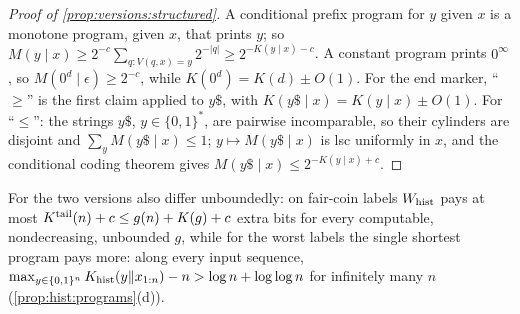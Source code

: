 \begin{proof}[Proof of \cref{prop:versions:structured}]
A conditional prefix program for $y$ given $x$ is a monotone program, given $x$, that prints $y$; so $M(y\mid x)\ge2^{-c}\sum_{q:V(q,x)=y}2^{-|q|}\ge2^{-K(y\mid x)-c}$. A constant program prints $0^\infty$, so $M(0^d\mid\epsilon)\ge2^{-c}$, while $K(0^d)=K(d)\pm O(1)$. For the end marker, ``$\ge$'' is the first claim applied to $y\$$, with $K(y\$\mid x)=K(y\mid x)\pm O(1)$. For ``$\le$'': the strings $y\$$, $y\in\{0,1\}^*$, are pairwise incomparable, so their cylinders are disjoint and $\sum_yM(y\$\mid x)\le1$; $y\mapsto M(y\$\mid x)$ is lsc uniformly in $x$, and the conditional coding theorem gives $M(y\$\mid x)\le2^{-K(y\mid x)+c}$.
\end{proof}

\begin{remark}\label{rem:versions:hist}
For \SFIhist{} the two versions also differ unboundedly: on fair-coin labels $W_{\mathrm{hist}}$ pays at most $K^{\mathrm{tail}}(n)+c\le g(n)+K(g)+c$ extra bits for every computable, nondecreasing, unbounded $g$, while for the worst labels the single shortest program pays more: along every input sequence, $\max_{y\in\{0,1\}^n}K_{\mathrm{hist}}(y\Vert x_{1:n})-n>\log n+\log\log n$ for infinitely many $n$ (\cref{prop:hist:programs}(d)).
\end{remark}
